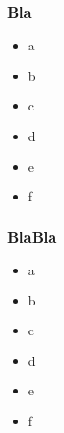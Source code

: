 \documentclass[ngerman]{beamer}
\begin{document}
\begin{frame}
\frametitle{Bla}

\begin{itemize}[<+->]
\item a
\item b
\item c
\item d
\item e
\item f
\end{itemize}
\end{frame}

\begin{frame}
\frametitle{BlaBla}

\begin{itemize}
\item<2-> a
\item<3-> b
\item<-4> c
\item d
\item<5> e
\item f
\end{itemize}
\end{frame}
\end{document}
